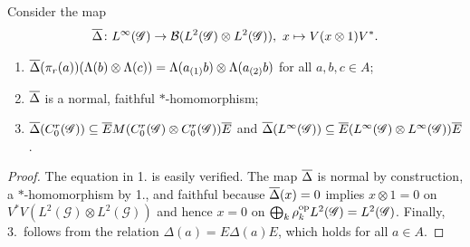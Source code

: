 Consider the map 
\begin{align*}
  \overline{\Delta} \colon L^{\infty}(\mathscr{G}) \to {\cal B}(L^{2}(\mathscr{G}) \otimes L^{2}(\mathscr{G})), \ x
  \mapsto V(x \otimes 1)V^{*}.
\end{align*}
\begin{Lem} \label{lemma:vn-delta}
  \begin{enumerate}
  \item $\overline{\Delta}(\pi_{r}(a)) (\Lambda(b) \otimes \Lambda(c)) =
    \Lambda(a_{(1)}b) \otimes \Lambda(a_{(2)}b)$ for all $a,b,c\in A$;
  \item $\overline{\Delta}$ is a normal, faithful $*$-homomorphism;
  \item  $\overline{\Delta}(C^{r}_{0}(\mathscr{G})) \subseteq \overline{E} M(C^{r}_{0}(\mathscr{G}) \otimes
  C^{r}_{0}(\mathscr{G}))\overline{E}$ and $\overline{\Delta}(L^{\infty}(\mathscr{G})) \subseteq \overline{E}(L^{\infty}(\mathscr{G}) \otimes
  L^{\infty}(\mathscr{G}))\overline{E}$.
  \end{enumerate}
\end{Lem}
\begin{proof}
  The equation in 1.{} is easily verified. The map $\overline{\Delta}$ is
  normal by construction, a $*$-homo\-morphism by 1.{}, and faithful
  because $\overline{\Delta}(x)=0$ implies $x\otimes 1=0$ on
  $V^{*}V(L^{2}(\mathscr{G}) \otimes L^{2}(\mathscr{G}))$ and hence
  $x=0$ on $\bigoplus_{k}
  \rho_{k}^{\operatorname{\mathrm{op}}}L^{2}(\mathscr{G})=L^{2}(\mathscr{G})$. Finally, 3.\
  follows from the relation $\Delta(a)=E\Delta(a)E$, which holds for
  all $a\in A$.
\end{proof}



